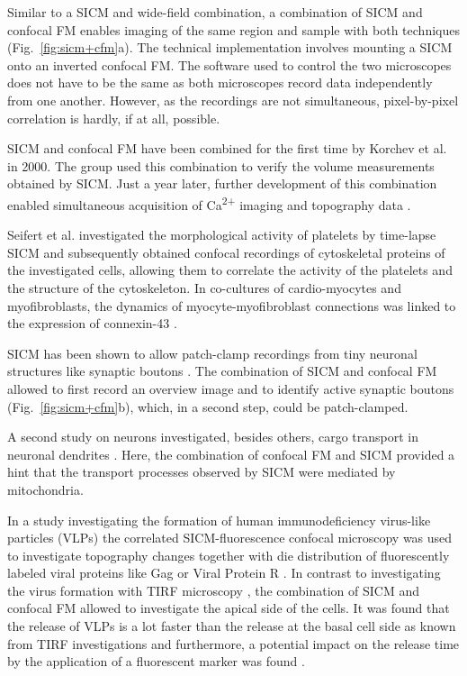 Similar to a SICM and wide-field combination, a combination of SICM and
confocal FM enables imaging of the same region and sample with both techniques
(Fig.~\ref{fig:sicm+cfm}a). The technical implementation involves mounting a
SICM onto an inverted confocal FM. The software used to control the two
microscopes does not have to be the same as both microscopes record data
independently from one another. However, as the recordings are not
simultaneous, pixel-by-pixel correlation is hardly, if at all, possible.

SICM and confocal FM have been combined for the first time by Korchev et al.
\cite{Korchev2000} in 2000. The group used this combination to verify the
volume measurements obtained by SICM. Just a year later, further development
of this combination enabled simultaneous acquisition of Ca\textsuperscript{2+}
imaging and topography data \cite{Shevchuk2001}.

Seifert et al. \cite{Seifert2017} investigated the morphological activity of
platelets by time-lapse SICM and subsequently obtained confocal recordings of
cytoskeletal proteins of the investigated cells, allowing them to correlate
the activity of the platelets and the structure of the cytoskeleton.
In co-cultures of cardio-myocytes and myofibroblasts, the dynamics of
myocyte-myofibroblast connections was linked to the expression of connexin-43
\cite{Schultz2019}.


SICM has been shown to allow patch-clamp recordings from tiny neuronal
structures like synaptic boutons \cite{Novak2013}. The combination of SICM and
confocal FM allowed to first record an overview image and to identify active
synaptic boutons (Fig.~\ref{fig:sicm+cfm}b), which, in a second step, could be
patch-clamped.

A second study on neurons investigated, besides others, cargo transport in
neuronal dendrites \cite{Takahashi2019}. Here, the combination of
confocal FM and SICM provided a hint that the transport processes observed by
SICM were mediated by mitochondria.


In a study investigating the formation of human immunodeficiency virus-like
particles (VLPs) the correlated SICM-fluorescence confocal microscopy was used
to investigate topography changes together with die distribution of
fluorescently labeled viral proteins like Gag or Viral Protein R
\cite{Bednarska2020}. In contrast to investigating the virus formation with
TIRF microscopy \cite{Jouvenet2008}, the combination of SICM and confocal FM
allowed to investigate the apical side of the cells. It was found that the
release of VLPs is a lot faster than the release at the basal cell side as
known from TIRF investigations and furthermore, a potential impact on the
release time by the application of a fluorescent marker was found
\cite{Bednarska2020}.

